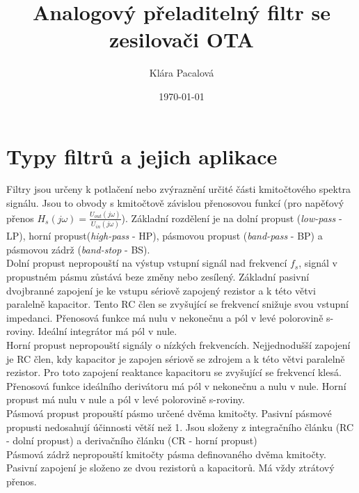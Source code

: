 \documentclass[twoside]{article}
\title{Analogový přeladitelný filtr se zesilovači OTA}
\author{Klára Pacalová}
\date{\today}
\begin{document}
\def\MapleOutput#1{{\begin{center}\begin{math}\color{MapleBlue}{#1}\end{math}\end{center}}}

\maketitle

\section{Typy filtrů a jejich aplikace}
Filtry jsou určeny k potlačení nebo zvýraznění určité části kmitočtového spektra signálu. Jsou to obvody s kmitočtově závislou přenosovou funkcí (pro napěťový přenos $H_s(j \omega) = \frac{U_{out}(j \omega)}{U_{in}(j \omega)}$). Základní rozdělení je na dolní propust (\textit{low-pass} - LP), horní propust(\textit{high-pass} - HP), pásmovou propust (\textit{band-pass} - BP) a pásmovou zádrž (\textit{band-stop} - BS). \\
Dolní propust nepropouští na výstup vstupní signál nad frekvencí $f_s$, signál v propustném pásmu zůstává beze změny nebo zesílený. Základní pasivní dvojbranné zapojení je ke vstupu sériově zapojený rezistor a k této větvi paralelně kapacitor. Tento RC člen se zvyšující se frekvencí snižuje svou vstupní impedanci. Přenosová funkce má nulu v nekonečnu a pól v levé polorovině s-roviny. Ideální integrátor má pól v nule. \\
Horní propust nepropouští signály o nízkých frekvencích. Nejjednodušší zapojení je RC člen, kdy kapacitor je zapojen sériově se zdrojem a k této větvi paralelně rezistor. Pro toto zapojení reaktance kapacitoru se zvyšující se frekvencí klesá. Přenosová funkce ideálního derivátoru má pól v nekonečnu a nulu v nule. Horní propust má nulu v nule a pól v levé polorovině s-roviny.\\
Pásmová propust propouští pásmo určené dvěma kmitočty. Pasivní pásmové propusti nedosahují účinnosti větší než 1. Jsou složeny z integračního článku (RC - dolní propust) a derivačního článku (CR - horní propust)\\
Pásmová zádrž nepropouští kmitočty pásma definovaného dvěma kmitočty. Pasivní zapojení je složeno ze dvou rezistorů a kapacitorů. Má vždy ztrátový přenos.
\end{document}
